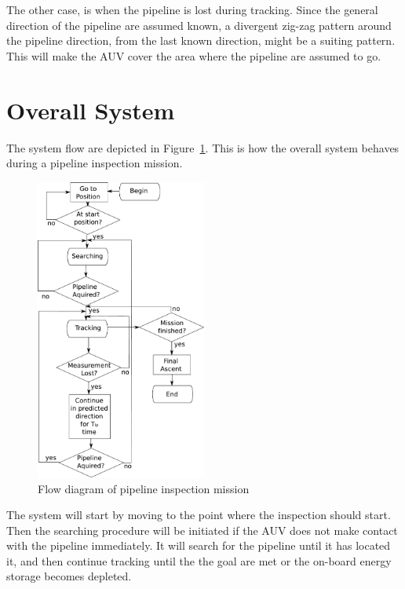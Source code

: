 		The other case, is when the pipeline is lost during tracking. Since the general direction of
		the pipeline are assumed known, a divergent zig-zag pattern around the pipeline direction, from the
 		last known direction, might be a suiting pattern. This will make the AUV cover the area
		where the pipeline are assumed to go.

	
\section{Overall System}
	The system flow are depicted in Figure~\ref{fig:ch2-flowdiagram}. This is how the overall system behaves
	during a pipeline inspection mission. 
	\begin{figure}[htbp]
		\centering
		\includegraphics[width=0.5\textwidth]{pics/Operation}
		\caption{Flow diagram of pipeline inspection mission}
		\label{fig:ch2-flowdiagram}
	\end{figure}
	The system will start by moving to the point where the inspection should start. Then the searching
	procedure will be initiated if the AUV does not make contact with the pipeline immediately. It will
	search for the pipeline until it has located it, and then continue tracking until the the goal are met
	or the on-board energy storage becomes depleted. 

